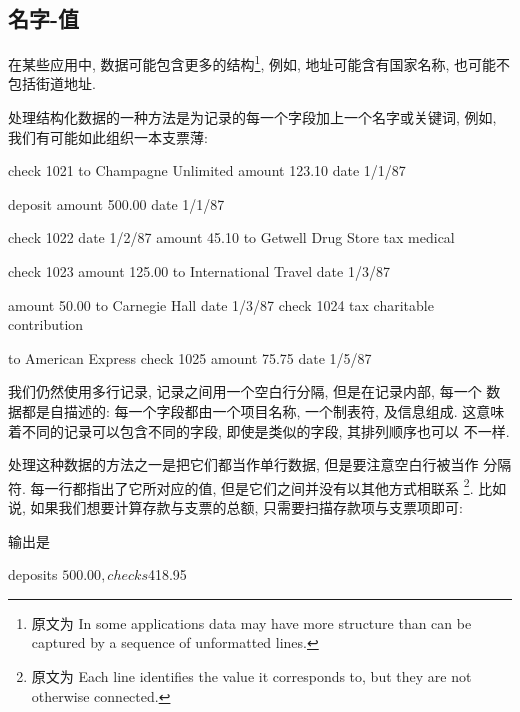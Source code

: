 \subsection{\mbox{名字}-值}
\label{subsec:name_value_data}


在某些应用中, 数据可能包含更多的结构\footnote{原文为 In some applications
    data may have more structure than can be captured by a sequence of
unformatted lines.}, 例如, 地址可能含有国家名称, 也可能不包括街道地址.

处理结构化数据的一种方法是为记录的每一个字段加上一个名字或关键词, 例如,
我们有可能如此组织一本支票薄:
\begin{shell}
    check	1021
    to	Champagne Unlimited
    amount	123.10
    date	1/1/87

    deposit
    amount	500.00
    date	1/1/87

    check	1022
    date	1/2/87
    amount	45.10
    to	Getwell Drug Store
    tax	medical

    check	1023
    amount	125.00
    to	International Travel
    date	1/3/87

    amount	50.00
    to	Carnegie Hall
    date	1/3/87
    check	1024
    tax	charitable contribution

    to	American Express
    check	1025
    amount	75.75
    date	1/5/87
\end{shell}
我们仍然使用多行记录, 记录之间用一个空白行分隔, 但是在记录内部, 每一个 
数据都是自描述的: 每一个字段都由一个项目名称, 一个制表符, 及信息组成.
这意味着不同的记录可以包含不同的字段, 即使是类似的字段, 其排列顺序也可以
不一样.

处理这种数据的方法之一是把它们都当作单行数据, 但是要注意空白行被当作
分隔符. 每一行都指出了它所对应的值,
但是它们之间并没有以其他方式相联系 \footnote{原文为 Each line identifies
the value it corresponds to, but they are not otherwise connected.}.
比如说, 如果我们想要计算存款与支票的总额, 只需要扫描存款项与支票项即可:
输出是 
\begin{shell}
    deposits $500.00, checks $418.95
\end{shell}

